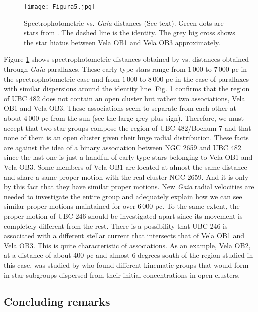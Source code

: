 \documentclass[baaa]{baaa}
\begin{document}
\begin{figure}[!t]
\centering
\texttt{[image: Figura5.jpg]}
\caption{Spectrophotometric vs. \textit{Gaia} distances (See text). Green dots are stars from \cite{Corti2007A&A...467..137C}. The dashed line is the identity. The grey big cross shows the star hiatus between Vela OB1 and Vela OB3 approximately.}
\label{Figura5}
\end{figure}

Figure \ref{Figura5} shows spectrophotometric distances obtained by \cite{Corti2007A&A...467..137C} vs. distances obtained through \textit{Gaia} parallaxes. These early-type stars range from $1\,000$ to $7\,000$ pc in the spectrophotometric case and from $1\,000$ to $8\,000$ pc in the case of parallaxes with similar dispersions around the identity line. Fig. \ref{Figura5} confirms that the region of UBC 482 does not contain an open cluster but rather two associations, Vela OB1 and Vela OB3. These associations seem to separate from each other at about $4\,000$ pc from the sun (see the large grey plus sign). Therefore, we must accept that two star groups compose the region of UBC 482/Bochum 7 and that none of them is an open cluster given their huge radial distribution. These facts are against the idea of a binary association between NGC 2659 and UBC 482 since the last one is just a handful of early-type stars belonging to Vela OB1 and Vela OB3. Some members of Vela OB1 are located at almost the same distance and share a same proper motion with the real cluster NGC 2659. And it is only by this fact that they have similar proper motions. New \textit{Gaia} radial velocities are needed to investigate the entire group and adequately explain how we can see similar proper motions maintained for over $6\,000$ pc. To the same extent, the proper motion of UBC 246 should be investigated apart since its movement is completely different from the rest. There is a possibility that UBC 246 is associated with a different stellar current that intersects that of Vela OB1 and Vela OB3. This is quite characteristic of associations. As an example, Vela OB2, at a distance of about 400 pc and almost 6 degrees south of the region studied in this case, was studied by \cite{Armstrong2022MNRAS.517.5704A} who found different kinematic groups that would form in star subgroups dispersed from their initial concentrations in open clusters. 

\subsection{ Concluding remarks}
\end{document}
